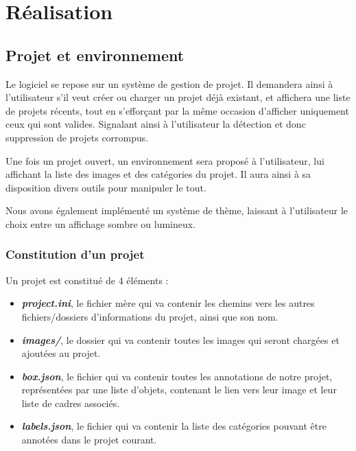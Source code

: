 \documentclass{rapport}
\begin{document}
    \section{Réalisation}
    
        \subsection{Projet et environnement}
        Le logiciel se repose sur un système de gestion de projet. Il demandera ainsi à l'utilisateur s'il veut créer ou charger un projet déjà existant, et affichera une liste de projets récents, tout en s'efforçant par la même occasion d'afficher uniquement ceux qui sont valides. Signalant ainsi à l'utilisateur la détection et donc suppression de projets corrompus.

        Une fois un projet ouvert, un environnement sera proposé à l'utilisateur, lui affichant la liste des images et des catégories du projet. Il aura ainsi à sa disposition divers outils pour manipuler le tout.

        Nous avons également implémenté un système de thème, laissant à l'utilisateur le choix entre un affichage sombre ou lumineux.
        
            \subsubsection{Constitution d'un projet}
            Un projet est constitué de 4 éléments : 
            \begin{itemize}
                \item \textbf{\textit{project.ini}}, le fichier mère qui va contenir les chemins vers les autres fichiers/dossiers d'informations du projet, ainsi que son nom.
                
                \item \textbf{\textit{images/}}, le dossier qui va contenir toutes les images qui seront chargées et ajoutées au projet.
                
                \item \textbf{\textit{box.json}}, le fichier qui va contenir toutes les annotations de notre projet, représentées par une liste d'objets, contenant le lien vers leur image et leur liste de cadres associés.
                
                \item \textbf{\textit{labels.json}}, le fichier qui va contenir la liste des catégories pouvant être annotées dans le projet courant.
            \end{itemize}
            
\end{document}
